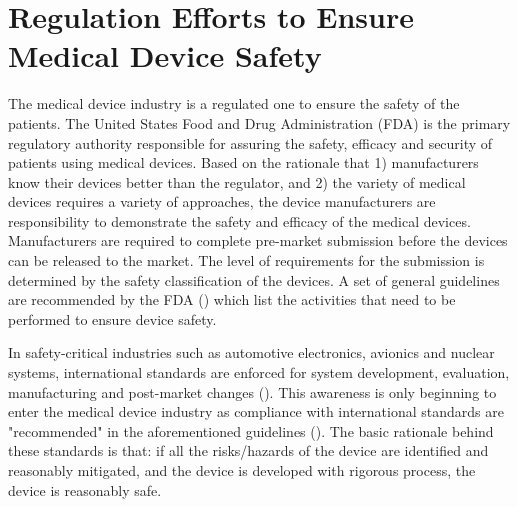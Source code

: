 \section{Regulation Efforts to Ensure Medical Device Safety}
The medical device industry is a regulated one to ensure the safety of the patients. The United States Food and Drug Administration (FDA) is the primary regulatory authority responsible for assuring the safety, efficacy and security of patients using medical devices. Based on the rationale that 1) manufacturers know their devices better than the regulator, and 2) the variety of medical devices requires a variety of approaches, the device manufacturers are responsibility to demonstrate the safety and efficacy of the medical devices. Manufacturers are required to complete pre-market submission before the devices can be released to the market. The level of requirements for the submission is determined by the safety classification of the devices. A set of general guidelines are recommended by the FDA (\cite{fda1, fda2, fda3}) which list the activities that need to be performed to ensure device safety. 

In safety-critical industries such as automotive electronics, avionics and nuclear systems, international standards are enforced for system development, evaluation, manufacturing and post-market changes (\cite{autosar,avsi}). This awareness is only beginning to enter the medical device industry as compliance with international standards are "recommended" in the aforementioned guidelines (\cite{formal_fda}). The basic rationale behind these standards is that: if all the risks/hazards of the device are identified and reasonably mitigated, and the device is developed with rigorous process, the device is reasonably safe. 

